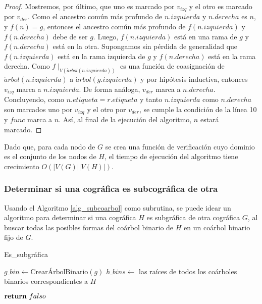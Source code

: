 \begin{proof}
    Mostremos, por último, que uno es marcado por $v_{izq}$ y el otro es
    marcado por $v_{der}$. Como el ancestro común más profundo de
    $n.izquierda$ y $n.derecha$ es $n$, y $f(n)=g$, entonces el ancestro
    común más profundo de $f(n.izquierda)$ y $f(n.derecha)$ debe de ser $g$.
    Luego, $f(n.izquierda)$ está en una rama de $g$ y $f(n.derecha)$ está en
    la otra. Supongamos sin pérdida de generalidad que $f(n.izquierda)$ está
    en la rama izquierda de $g$ y $f(n.derecha)$ está en la rama derecha.
    Como $f\mid_{V(\acute{a}rbol(n.izquierda))}$ es una función de
    coasignación de $\acute{a}rbol(n.izquierda)$ a $\acute{a}rbol
    (g.izquierda)$ y por hip\'otesis inductiva, entonces $v_{izq}$ marca a
    $n.izquierda$. De forma análoga, $v_{der}$ marca a $n.derecha$.
    Concluyendo, como $n.etiqueta = r.etiqueta$ y tanto $n.izquierda$ como
    $n.derecha$ son marcados uno por $v_{izq}$ y el otro por $v_{der}$, se
    cumple la condición de la línea 10 y $func$ marca a $n$. Así, al final de
    la ejecución del algoritmo, $n$ estará marcado.

\end{proof}

Dado que, para cada nodo de $G$ se crea una función de verificación cuyo
dominio es el conjunto de los nodos de $H$, el tiempo de ejecución del
algoritmo tiene crecimiento $O(|V(G)| |V(H)|)$.

\subsubsection{Determinar si una cográfica es subcográfica de otra}

Usando el Algoritmo \ref{alg_subcoarbol} como subrutina, se puede idear
un algoritmo para determinar si una cográfica $H$ es subgráfica de otra
cográfica $G$, al buscar todas las posibles formas del coárbol binario de
$H$ en un coárbol binario fijo de $G$.

\begin{algorithm}[ht!]
\caption{Es\_subgráfica}
\label{alg_subgraph}
\DontPrintSemicolon %

$g\_bin \gets \text{CrearÁrbolBinario}(g)$\;
$h\_bins \gets$ las raíces de todos los coárboles binarios correspondientes a $H$\;


$\Return\ falso$\;

\end{algorithm}

